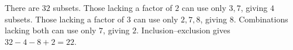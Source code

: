 There are $32$ subsets. Those lacking a factor of $2$ can use only $3,7$, giving $4$ subsets. Those lacking a factor of $3$ can use only $2,7,8$, giving $8$. Combinations lacking both can use only $7$, giving $2$. Inclusion--exclusion gives $32-4-8+2=\boxed{22}$.
